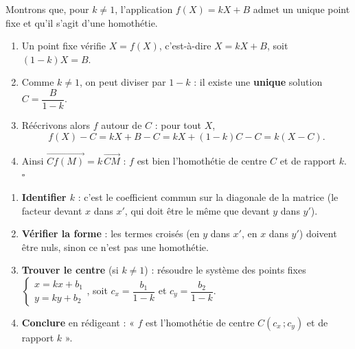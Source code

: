 \documentclass[11pt]{article}
\begin{document}
\begin{experience}
Montrons que, pour $k \neq 1$, l'application $f(X) = kX + B$ admet un unique point fixe et qu'il s'agit d'une homothétie.
\begin{enumerate}
\item Un point fixe vérifie $X = f(X)$, c'est-à-dire $X = kX + B$, soit $(1-k)X = B$.
\item Comme $k \neq 1$, on peut diviser par $1 - k$ : il existe une \textbf{unique} solution $C = \dfrac{B}{1-k}$.
\item Réécrivons alors $f$ autour de $C $ : pour tout $X$,
\[ f(X) - C = kX + B - C = kX + (1-k)C - C = k(X - C). \]
\item Ainsi $\overrightarrow{Cf(M)} = k\,\overrightarrow{CM}$ : $f$ est bien l'homothétie de centre $C$ et de rapport $k$. $\square$
\end{enumerate}
\end{experience}

\begin{methode}
\begin{enumerate}
\item \textbf{Identifier $k$} : c'est le coefficient commun sur la diagonale de la matrice (le facteur devant $x$ dans $x'$, qui doit être le même que devant $y$ dans $y'$).
\item \textbf{Vérifier la forme} : les termes croisés (en $y$ dans $x'$, en $x$ dans $y'$) doivent être nuls, sinon ce n'est pas une homothétie.
\item \textbf{Trouver le centre} (si $k \neq 1$) : résoudre le système des points fixes $\begin{cases} x = kx + b_1 \\ y = ky + b_2 \end{cases}$, soit $c_x = \dfrac{b_1}{1-k}$ et $c_y = \dfrac{b_2}{1-k}$.
\item \textbf{Conclure} en rédigeant : « $f$ est l'homothétie de centre $C(c_x\,;c_y)$ et de rapport $k$ ».
\end{enumerate}
\end{methode}
\end{document}
